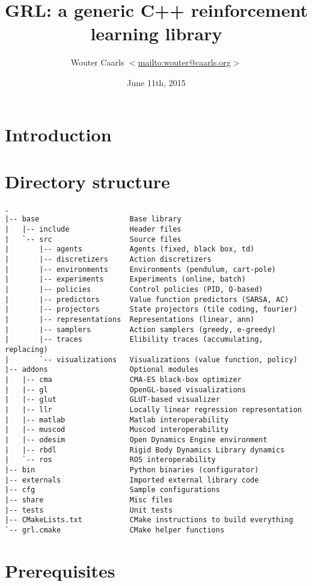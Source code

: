 \documentclass{article}
\title{GRL: a generic C++ reinforcement learning library}
\author{Wouter Caarls $<$\url{mailto:wouter@caarls.org}$>$}
\date{June 11th, 2015}
\begin{document}
\maketitle

\section{Introduction}

\section{Directory structure}

\begin{verbatim}
.
|-- base                     Base library
|   |-- include              Header files
|   `-- src                  Source files
|       |-- agents           Agents (fixed, black box, td)
|       |-- discretizers     Action discretizers
|       |-- environments     Environments (pendulum, cart-pole)
|       |-- experiments      Experiments (online, batch)
|       |-- policies         Control policies (PID, Q-based)
|       |-- predictors       Value function predictors (SARSA, AC)
|       |-- projectors       State projectors (tile coding, fourier)
|       |-- representations  Representations (linear, ann) 
|       |-- samplers         Action samplers (greedy, e-greedy)
|       |-- traces           Elibility traces (accumulating, replacing)
|       `-- visualizations   Visualizations (value function, policy)
|-- addons                   Optional modules
|   |-- cma                  CMA-ES black-box optimizer
|   |-- gl                   OpenGL-based visualizations
|   |-- glut                 GLUT-based visualizer
|   |-- llr                  Locally linear regression representation
|   |-- matlab               Matlab interoperability
|   |-- muscod               Muscod interoperability
|   |-- odesim               Open Dynamics Engine environment
|   |-- rbdl                 Rigid Body Dynamics Library dynamics
|   `-- ros                  ROS interoperability
|-- bin                      Python binaries (configurator)
|-- externals                Imported external library code
|-- cfg                      Sample configurations
|-- share                    Misc files
|-- tests                    Unit tests
|-- CMakeLists.txt           CMake instructions to build everything
`-- grl.cmake                CMake helper functions
\end{verbatim}

\section{Prerequisites}
\end{document}
